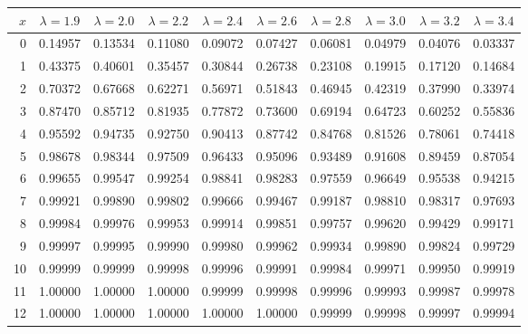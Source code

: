 \myskip
\begin{tabular}{r|*{9}{c}}
$x$ &  $\lambda=1.9$  &  $\lambda=2.0$  &  $\lambda=2.2$  &  $\lambda=2.4$  &  $\lambda=2.6$  
    &  $\lambda=2.8$  &  $\lambda=3.0$  &  $\lambda=3.2$  &  $\lambda=3.4$                    \\\hline
  0 & 0.14957 & 0.13534 & 0.11080 & 0.09072 & 0.07427 & 0.06081 & 0.04979 & 0.04076 & 0.03337 \\
  1 & 0.43375 & 0.40601 & 0.35457 & 0.30844 & 0.26738 & 0.23108 & 0.19915 & 0.17120 & 0.14684 \\
  2 & 0.70372 & 0.67668 & 0.62271 & 0.56971 & 0.51843 & 0.46945 & 0.42319 & 0.37990 & 0.33974 \\
  3 & 0.87470 & 0.85712 & 0.81935 & 0.77872 & 0.73600 & 0.69194 & 0.64723 & 0.60252 & 0.55836 \\
  4 & 0.95592 & 0.94735 & 0.92750 & 0.90413 & 0.87742 & 0.84768 & 0.81526 & 0.78061 & 0.74418 \\
  5 & 0.98678 & 0.98344 & 0.97509 & 0.96433 & 0.95096 & 0.93489 & 0.91608 & 0.89459 & 0.87054 \\
  6 & 0.99655 & 0.99547 & 0.99254 & 0.98841 & 0.98283 & 0.97559 & 0.96649 & 0.95538 & 0.94215 \\
  7 & 0.99921 & 0.99890 & 0.99802 & 0.99666 & 0.99467 & 0.99187 & 0.98810 & 0.98317 & 0.97693 \\
  8 & 0.99984 & 0.99976 & 0.99953 & 0.99914 & 0.99851 & 0.99757 & 0.99620 & 0.99429 & 0.99171 \\
  9 & 0.99997 & 0.99995 & 0.99990 & 0.99980 & 0.99962 & 0.99934 & 0.99890 & 0.99824 & 0.99729 \\
 10 & 0.99999 & 0.99999 & 0.99998 & 0.99996 & 0.99991 & 0.99984 & 0.99971 & 0.99950 & 0.99919 \\
 11 & 1.00000 & 1.00000 & 1.00000 & 0.99999 & 0.99998 & 0.99996 & 0.99993 & 0.99987 & 0.99978 \\
 12 & 1.00000 & 1.00000 & 1.00000 & 1.00000 & 1.00000 & 0.99999 & 0.99998 & 0.99997 & 0.99994 \\
\end{tabular}

